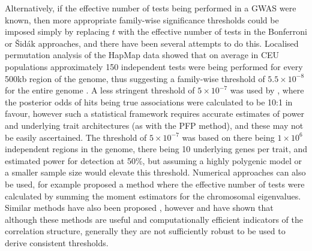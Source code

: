 Alternatively, if the effective number of tests being performed in a GWAS were known, then more appropriate family-wise significance thresholds could be imposed simply by replacing $t$ with the effective number of tests in the Bonferroni or \v{S}id\'{a}k approaches, and there have been several attempts to do this. Localised permutation analysis of the HapMap data showed that on average in CEU populations approximately 150 independent tests were being performed for every 500kb region of the genome, thus suggesting a family-wise threshold of $5.5\times10^{-8}$ for the entire genome \citep{TheInternationalHapmapConsortium2005}. A less stringent threshold of $5\times10^{-7}$ was used by \citet{TheWellcomeTrustCaseControlConsortium2007}, where the posterior odds of hits being true associations were calculated to be 10:1 in favour, however such a statistical framework requires accurate estimates of power and underlying trait architectures (as with the PFP method), and these may not be easily ascertained. The threshold of $5\times10^{-7}$ was based on there being $1\times10^6$ independent regions in the genome, there being 10 underlying genes per trait, and estimated power for detection at 50\%, but assuming a highly polygenic model or a smaller sample size would elevate this threshold. Numerical approaches can also be used, for example \citet{Patterson2006} proposed a method where the effective number of tests were calculated by summing the moment estimators for the chromosomal eigenvalues. Similar methods have also been proposed \citep{Nyholt2004, Li2005, Gao2008, Moskvina2008}, however \citet{Dudbridge2008} and \citet{Salyakina2005} have shown that although these methods are useful and computationally efficient indicators of the correlation structure, generally they are not sufficiently robust to be used to derive consistent thresholds.

